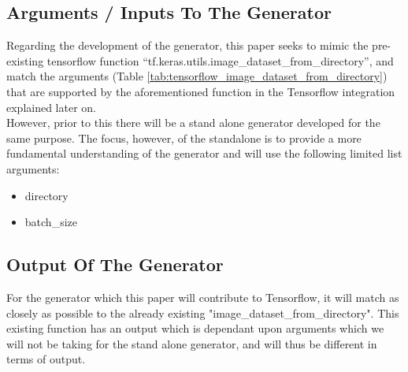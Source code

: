 \documentclass[
	letterpaper, %
	10pt, %
	unnumberedsections, %
	twoside, %
]{LTJournalArticle}
\begin{document}
\subsection{Arguments / Inputs To The Generator}
Regarding the development of the generator, this paper seeks to mimic the pre-existing tensorflow function “tf.keras.utils.image\_dataset\_from\_directory”, and match the arguments (Table \ref{tab:tensorflow_image_dataset_from_directory}) that are supported by the aforementioned function\autocite{image_dataset_from_directory} in the Tensorflow integration explained later on. \\
However, prior to this there will be a stand alone generator developed for the same purpose. The focus, however, of the standalone is to provide a more fundamental understanding of the generator and will use the following limited list arguments:
\begin{itemize}[noitemsep,topsep=-8pt]
	\item directory
	\item batch\_size
\end{itemize}


%

\subsection{Output Of The Generator}

For the generator which this paper will contribute to Tensorflow, it will match as closely as possible to the already existing "image\_dataset\_from\_directory". This existing function has an output which is dependant upon arguments which we will not be taking for the stand alone generator, and will thus be different in terms of output.
\end{document}
